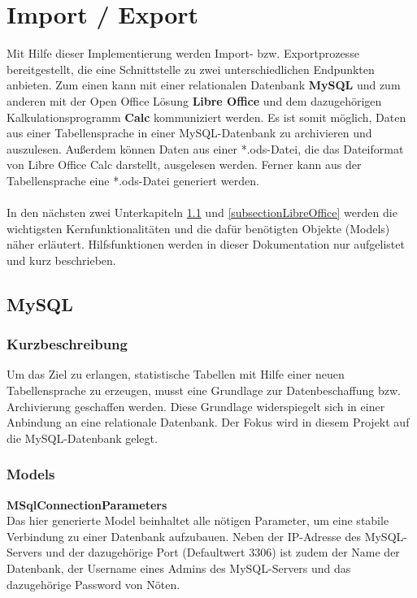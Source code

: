 \section{Import / Export}
\label{sectionImportExport}

Mit Hilfe dieser Implementierung werden Import- bzw. Exportprozesse bereitgestellt, die eine Schnittstelle zu zwei unterschiedlichen Endpunkten anbieten. Zum einen kann mit einer relationalen Datenbank \textbf{MySQL} und zum anderen mit der Open Office Lösung \textbf{Libre Office} und dem dazugehörigen Kalkulationsprogramm \textbf{Calc} kommuniziert werden. Es ist somit möglich, Daten aus einer Tabellensprache in einer MySQL-Datenbank zu archivieren und auszulesen. Außerdem können Daten aus einer *.ods-Datei, die das Dateiformat von Libre Office Calc darstellt, ausgelesen werden. Ferner kann aus der Tabellensprache eine *.ods-Datei generiert werden.
\\\\
In den nächsten zwei Unterkapiteln \ref{subsectionMySql} und \ref{subsectionLibreOffice} werden die wichtigsten Kernfunktionalitäten und die dafür benötigten Objekte (Models) näher erläutert. Hilfsfunktionen werden in dieser Dokumentation nur aufgelistet und kurz beschrieben.

\subsection{MySQL}
\label{subsectionMySql}
\subsubsection{Kurzbeschreibung}
\label{mysqlDescription}
Um das Ziel zu erlangen, statistische Tabellen mit Hilfe einer neuen Tabellensprache zu erzeugen, musst eine Grundlage zur Datenbeschaffung bzw. Archivierung geschaffen werden. Diese Grundlage widerspiegelt sich in einer Anbindung an eine relationale Datenbank. Der Fokus wird in diesem Projekt auf die MySQL-Datenbank gelegt.

\subsubsection{Models}
\label{mysqlModels}
\textbf{MSqlConnectionParameters}\\
Das hier generierte Model beinhaltet alle nötigen Parameter, um eine stabile Verbindung zu einer Datenbank aufzubauen. Neben der IP-Adresse des MySQL-Servers und der dazugehörige Port (Defaultwert 3306) ist zudem der Name der Datenbank, der Username eines Admins des MySQL-Servers und das dazugehörige Password von Nöten.

